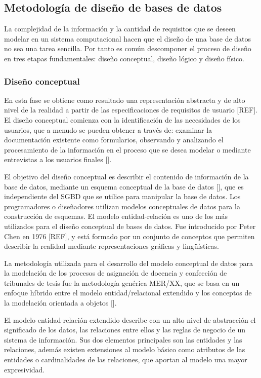 \subsection{Metodología de diseño de bases de datos}
La complejidad de la información y la cantidad de requisitos que se 
deseen modelar en un sistema computacional hacen que el diseño de una 
base de datos no sea una tarea sencilla. Por tanto es común 
descomponer el proceso de diseño en tres etapas fundamentales: diseño conceptual,
diseño lógico y diseño físico. 


\subsubsection{Diseño conceptual}
En esta fase se obtiene como resultado una representación 
abstracta y de alto nivel de la realidad a partir de las 
especificaciones de requisitos de usuario [REF]. El diseño
conceptual comienza con la identificación de las necesidades de los 
usuarios, que a menudo se pueden obtener a través de: examinar
la documentación existente como formularios, observando y
analizando el procesamiento de la información en el proceso que 
se desea modelar o mediante entrevistas a los usuarios finales [\cite{db_requirement_analysis}].

El objetivo del diseño conceptual es describir el contenido de 
información de la base de datos, mediante un esquema conceptual de
la base de datos [\cite{db_book_cap3}], que es independiente del SGBD
que se utilice para manipular la base de datos.
Los programadores o diseñadores utilizan modelos conceptuales de datos 
para la construcción de esquemas. El modelo entidad-relación es uno 
de los más utilizados para el diseño conceptual de bases de datos. Fue 
introducido por Peter Chen en 1976 [REF], y está formado por 
un conjunto de conceptos que permiten describir la realidad mediante 
representaciones gráficas y lingüísticas.

La metodología utilizada 
para el desarrollo del modelo conceptual de datos para la modelación 
de los procesos de asignación de docencia y confección de tribunales de 
tesis fue la metodología genérica MER/XX, que se basa en un enfoque
híbrido entre el modelo entidad/relacional extendido y los conceptos de la 
modelación orientada a objetos [\cite{db_book_cap2}]. 

El modelo entidad-relación extendido describe con un alto nivel de abstracción
el significado de los datos, las relaciones entre ellos y las reglas de negocio 
de un sistema de información. Sus dos elementos principales son las entidades y 
las relaciones, además existen extensiones al modelo básico 
como atributos de las entidades o cardinalidades de las relaciones, 
que aportan al modelo una mayor expresividad.



